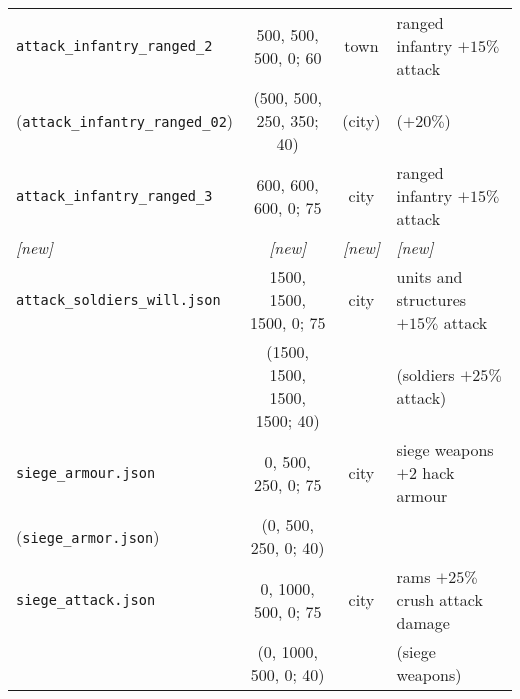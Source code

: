 \documentclass{article}
\begin{document}
\begin{tabular}{l|cc|l}
\verb+attack_infantry_ranged_2+              &   500,  500,  500,    0;  60  & town       & ranged infantry $+15\%$ attack \\
(\verb+attack_infantry_ranged_02+)           &  (500,  500,  250,  350;  40) & (city)     & ($+20\%$) \\
\hline
\verb+attack_infantry_ranged_3+              &   600,  600,  600,    0;  75  & city       & ranged infantry $+15\%$ attack \\
\emph{[new]} & \emph{[new]} & \emph{[new]} & \emph{[new]} \\
\hline
\verb+attack_soldiers_will.json+             &  1500, 1500, 1500,    0;  75  & city       & units and structures $+15\%$ attack \\
                                             & (1500, 1500, 1500, 1500;  40) &            & (soldiers $+25\%$ attack) \\
\hline
\verb+siege_armour.json+                     &     0,  500,  250,    0;  75  & city       & siege weapons $+2$ hack armour \\
(\verb+siege_armor.json+)                    &    (0,  500,  250,    0;  40) &            & \\
\hline
\verb+siege_attack.json+                     &     0, 1000,  500,    0;  75  & city       & rams $+25\%$ crush attack damage \\
                                             &    (0, 1000,  500,    0;  40) &            & (siege weapons)\\
\end{tabular}
\end{document}
